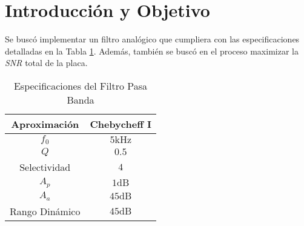 \chapter*{Introducción y Objetivo }

Se buscó implementar un filtro analógico que cumpliera con las especificaciones detalladas en la Tabla \ref{tab:specs}. Además, también se buscó en el proceso maximizar la \textit{SNR} total de la placa.

\begin{table}[ht]
\begin{center}
\begin{tabular}{||c|c||}
\hline
Aproximación	&	Chebycheff I	\\
\hline
\hline
$f_0$	&	$5 \si{\kilo\hertz}$	\\
\hline
$Q$	&	$0.5$	\\
\hline
Selectividad	&	$4$	\\
\hline
$A_p$	&	$1 \si{\deci\bel}$	\\
\hline
$A_a$	&	$45 \si{\deci\bel}$	\\
\hline
Rango Dinámico	&	$45 \si{\deci\bel}$	\\
\hline
\end{tabular}
\caption{Especificaciones del Filtro Pasa Banda}
\label{tab:specs}
\end{center}
\end{table}

